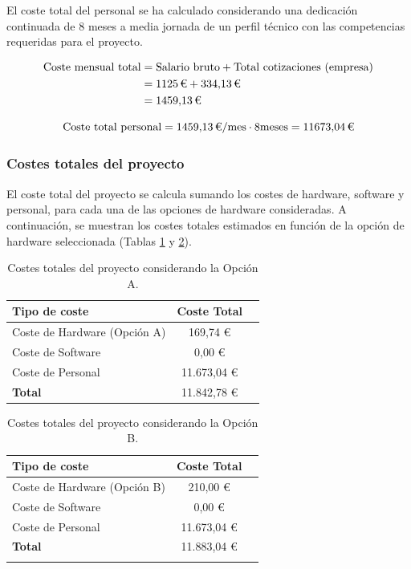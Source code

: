 El coste total del personal se ha calculado considerando una dedicación continuada de 8 meses a media jornada de un perfil técnico con las competencias requeridas para el proyecto.

\begin{align*}
\text{Coste mensual total} &= \text{Salario bruto} + \text{Total cotizaciones (empresa)} \\
&= 1125\,\text{\texteuro{}} + 334{,}13\,\text{\texteuro{}} \\ 
&= 1459{,}13\,\text{\texteuro{}} 
\end{align*}

\begin{equation*}
\text{Coste total personal} = 1459{,}13\,\text{\texteuro{}}/\text{mes} \cdot 8 \text{meses} = 11673{,}04\,\text{\texteuro{}} 
\end{equation*}



 \subsubsection{Costes totales del proyecto}
 El coste total del proyecto se calcula sumando los costes de hardware, software y personal, para cada una de las opciones de hardware consideradas. A continuación, se muestran los costes totales estimados en función de la opción de hardware seleccionada (Tablas \ref{tab:costes_total_A} y \ref{tab:costes_total_B}).

 
 \begin{table}[h]
    \centering
    \begin{tabular}{lcc}
    \textbf{Tipo de coste} & \textbf{Coste Total}\\
    \hline
    Coste de Hardware (Opción A)  & 169,74 €\\
    Coste de Software & 0,00 €\\
    Coste de Personal & 11.673,04 €\\
    \textbf{Total} & 11.842,78 €\\
    \end{tabular}
    \caption{Costes totales del proyecto considerando la Opción A.} \label{tab:costes_total_A}
\end{table}

 \begin{table}[h]
    \centering
    \begin{tabular}{lcc}
    \textbf{Tipo de coste} & \textbf{Coste Total}\\
    \hline
    Coste de Hardware (Opción B)  & 210,00 €\\
    Coste de Software & 0,00 €\\
    Coste de Personal & 11.673,04 €\\
    \textbf{Total} & 11.883,04 €\\
    \hfill
    \end{tabular}
    \caption{Costes totales del proyecto considerando la Opción B.} \label{tab:costes_total_B}
\end{table}

